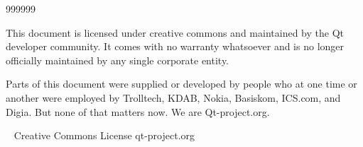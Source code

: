   \begin{slide}{999999}
  
    This document is licensed under creative commons and maintained by
    the Qt developer community. It comes with no warranty whatsoever and
    is no longer officially maintained by any single corporate entity.

    Parts of this document were supplied or developed by people who at
    one time or another were employed by Trolltech,  KDAB, Nokia,
    Basiskom, ICS.com, and Digia. But none of that matters now. We are
    Qt-project.org.

    \vspace{5em}
    \textcopyright~ Creative Commons License qt-project.org
    \vspace*{2em}                                                     

  \end{slide}

